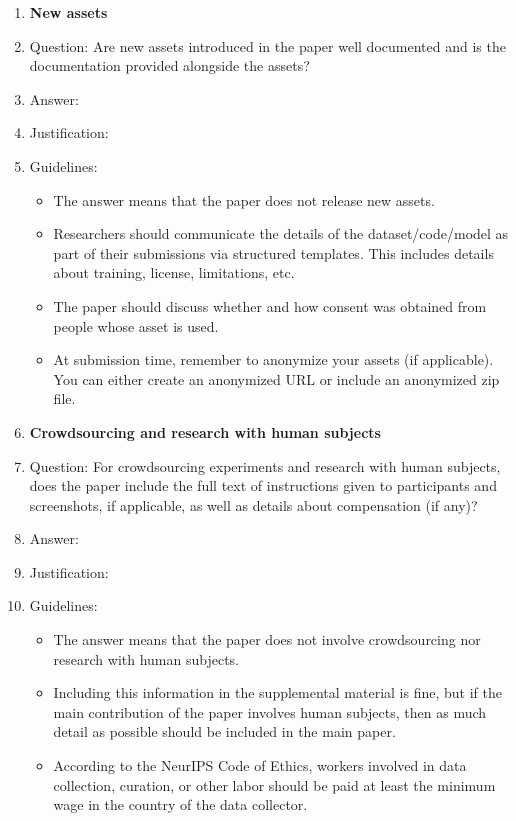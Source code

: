 \documentclass{article}
\begin{document}
\begin{enumerate}
\item {\bf New assets}
    \item[] Question: Are new assets introduced in the paper well documented and is the documentation provided alongside the assets?
    \item[] Answer: \answerTODO{} %
    \item[] Justification: \justificationTODO{}
    \item[] Guidelines:
    \begin{itemize}
        \item The answer \answerNA{} means that the paper does not release new assets.
        \item Researchers should communicate the details of the dataset\slash code\slash model as part of their submissions via structured templates. This includes details about training, license, limitations, etc. 
        \item The paper should discuss whether and how consent was obtained from people whose asset is used.
        \item At submission time, remember to anonymize your assets (if applicable). You can either create an anonymized URL or include an anonymized zip file.
    \end{itemize}

\item {\bf Crowdsourcing and research with human subjects}
    \item[] Question: For crowdsourcing experiments and research with human subjects, does the paper include the full text of instructions given to participants and screenshots, if applicable, as well as details about compensation (if any)? 
    \item[] Answer: \answerTODO{} %
    \item[] Justification: \justificationTODO{}
    \item[] Guidelines:
    \begin{itemize}
        \item The answer \answerNA{} means that the paper does not involve crowdsourcing nor research with human subjects.
        \item Including this information in the supplemental material is fine, but if the main contribution of the paper involves human subjects, then as much detail as possible should be included in the main paper. 
        \item According to the NeurIPS Code of Ethics, workers involved in data collection, curation, or other labor should be paid at least the minimum wage in the country of the data collector. 
    \end{itemize}


\end{enumerate}
\end{document}
